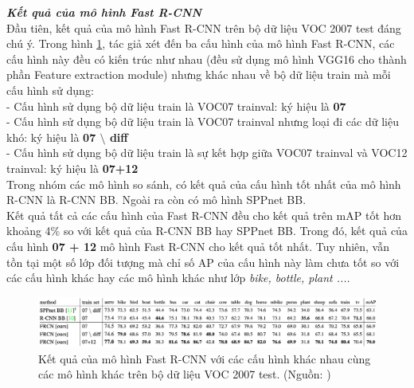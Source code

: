 {    \noindent
    \textbf{\textit{Kết quả của mô hình Fast R-CNN}} \\
    Đầu tiên, kết quả của mô hình Fast R-CNN trên bộ dữ liệu VOC 2007 test đáng chú ý.
    Trong hình \ref{fig:fast_rcnn_results_1}, tác giả xét đến ba cấu hình của mô hình Fast R-CNN, các cấu hình này đều có kiến trúc như nhau (đều sử dụng mô hình VGG16 cho thành phần Feature extraction module) nhưng khác nhau về bộ dữ liệu train mà mỗi cấu hình sử dụng: \\
    - Cấu hình sử dụng bộ dữ liệu train là VOC07 trainval: ký hiệu là \textbf{07} \\
    - Cấu hình sử dụng bộ dữ liệu train là VOC07 trainval nhưng loại đi các dữ liệu khó: ký hiệu là \textbf{07 $\setminus$ diff} \\
    - Cấu hình sử dụng bộ dữ liệu train là sự kết hợp giữa VOC07 trainval và VOC12 trainval: ký hiệu là \textbf{07+12} \\
    Trong nhóm các mô hình so sánh, có kết quả của cấu hình tốt nhất của mô hình R-CNN là R-CNN BB.
    Ngoài ra còn có mô hình SPPnet BB. \\
    Kết quả tất cả các cấu hình của Fast R-CNN đều cho kết quả trên mAP tốt hơn khoảng 4\% so với kết quả của R-CNN BB hay SPPnet BB.
    Trong đó, kết quả của cấu hình \textbf{07 + 12} mô hình Fast R-CNN cho kết quả tốt nhất.
    Tuy nhiên, vẫn tồn tại một số lớp đối tượng mà chỉ số AP của cấu hình này làm chưa tốt so với các cấu hình khác hay các mô hình khác như lớp \textit{bike, bottle, plant ...}.

    \begin{figure}[H]
        \centering
        \includegraphics[width=15cm] {images/fast_rcnn_results_1}
        \caption{Kết quả của mô hình Fast R-CNN với các cấu hình khác nhau cùng các mô hình khác trên bộ dữ liệu VOC 2007 test. (Nguồn: \cite{girshick2015fast})}
        \label{fig:fast_rcnn_results_1}
    \end{figure}

}
